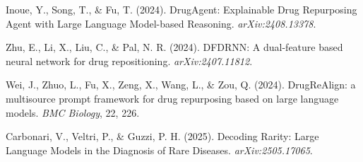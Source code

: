 \documentclass{article}
\begin{document}
\begin{thebibliography}{20}
Inoue, Y., Song, T., \& Fu, T. (2024). DrugAgent: Explainable Drug Repurposing Agent with Large Language Model-based Reasoning. \emph{arXiv:2408.13378}.

Zhu, E., Li, X., Liu, C., \& Pal, N. R. (2024). DFDRNN: A dual-feature based neural network for drug repositioning. \emph{arXiv:2407.11812}.

Wei, J., Zhuo, L., Fu, X., Zeng, X., Wang, L., \& Zou, Q. (2024). DrugReAlign: a multisource prompt framework for drug repurposing based on large language models. \emph{BMC Biology}, 22, 226.

Carbonari, V., Veltri, P., \& Guzzi, P. H. (2025). Decoding Rarity: Large Language Models in the Diagnosis of Rare Diseases. \emph{arXiv:2505.17065}.

\end{thebibliography}
\end{document}
